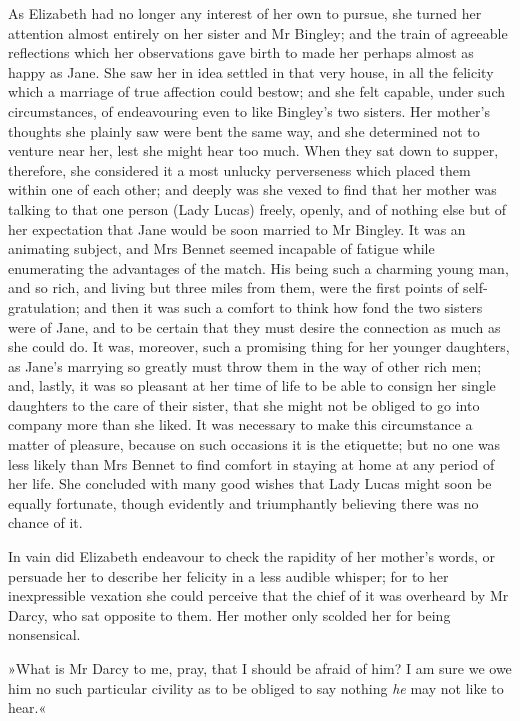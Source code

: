 As Elizabeth had no longer any interest of her own to pursue, she turned her attention almost entirely on her sister and Mr Bingley; and the train of agreeable reflections which her observations gave birth to made her perhaps almost as happy as Jane. She saw her in idea settled in that very house, in all the felicity which a marriage of true affection could bestow; and she felt capable, under such circumstances, of endeavouring even to like Bingley's two sisters. Her mother's thoughts she plainly saw were bent the same way, and she determined not to venture near her, lest she might hear too much. When they sat down to supper, therefore, she considered it a most unlucky perverseness which placed them within one of each other; and deeply was she vexed to find that her mother was talking to that one person (Lady Lucas) freely, openly, and of nothing else but of her expectation that Jane would be soon married to Mr Bingley. It was an animating subject, and Mrs Bennet seemed incapable of fatigue while enumerating the advantages of the match. His being such a charming young man, and so rich, and living but three miles from them, were the first points of self-gratulation; and then it was such a comfort to think how fond the two sisters were of Jane, and to be certain that they must desire the connection as much as she could do. It was, more\-over, such a promising thing for her younger daughters, as Jane's marrying so greatly must throw them in the way of other rich men; and, lastly, it was so pleasant at her time of life to be able to consign her single daughters to the care of their sister, that she might not be obliged to go into company more than she liked. It was necessary to make this circumstance a matter of pleasure, because on such occasions it is the etiquette; but no one was less likely than Mrs Bennet to find comfort in staying at home at any period of her life. She concluded with many good wishes that Lady Lucas might soon be equally fortunate, though evidently and triumphantly believing there was no chance of it.

In vain did Elizabeth endeavour to check the rapidity of her mother's words, or persuade her to describe her felicity in a less audible whisper; for to her inexpressible vexation she could perceive that the chief of it was overheard by Mr Darcy, who sat opposite to them. Her mother only scolded her for being nonsensical.

»What is Mr Darcy to me, pray, that I should be afraid of him? I am sure we owe him no such particular civility as to be obliged to say nothing \textit{he} may not like to hear.«

